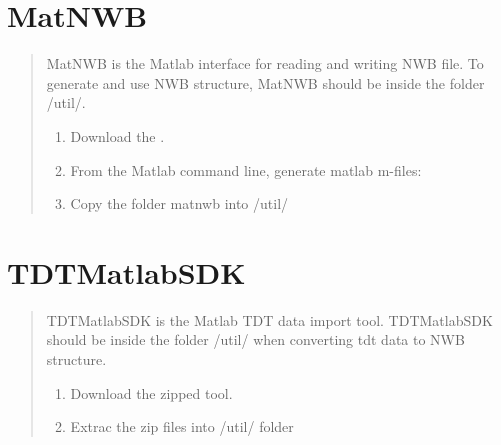 \documentclass[letterpaper,10pt,english]{sphinxmanual}
\begin{document}
\section{MatNWB}
\label{\detokenize{pretoolboxes:matnwb}}\label{\detokenize{pretoolboxes:installmatnwb-label}}\begin{quote}

MatNWB is the Matlab interface for reading and writing NWB file. To generate and use NWB structure, MatNWB should be inside the folder /util/.
\begin{enumerate}
\def\theenumi{\arabic{enumi}}
\def\labelenumi{\theenumi .}
\makeatletter\def\p@enumii{\p@enumi \theenumi .}\makeatother
\item {} 
Download the  .
\begin{quote}
\end{quote}

\item {} 
From the Matlab command line, generate matlab m-files:

\begin{sphinxVerbatim}[commandchars=\\\{\}]
\end{sphinxVerbatim}

\item {} 
Copy the folder matnwb into /util/

\end{enumerate}
\end{quote}


\section{TDTMatlabSDK}
\label{\detokenize{pretoolboxes:tdtmatlabsdk}}\label{\detokenize{pretoolboxes:installtdtmatsdk-label}}\begin{quote}

TDTMatlabSDK is the Matlab TDT data import tool. TDTMatlabSDK should be inside the folder /util/ when converting tdt data to NWB structure.
\begin{enumerate}
\def\theenumi{\arabic{enumi}}
\def\labelenumi{\theenumi .}
\makeatletter\def\p@enumii{\p@enumi \theenumi .}\makeatother
\item {} 
Download the zipped  tool.
\begin{quote}
\end{quote}

\item {} 
Extrac the zip files into /util/ folder

\end{enumerate}
\end{quote}
\end{document}
